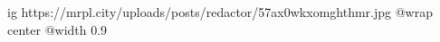  
 
 
 
 

\ifcmt
  ig https://mrpl.city/uploads/posts/redactor/57ax0wkxomghthmr.jpg
  @wrap center
  @width 0.9
\fi
